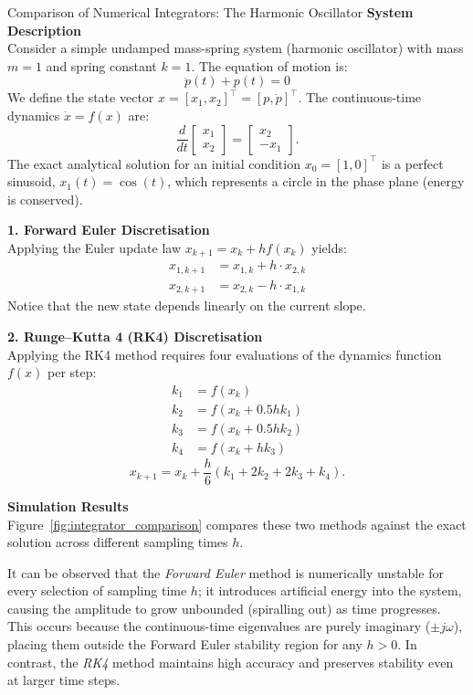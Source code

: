 \begin{examplebox}{Comparison of Numerical Integrators: The Harmonic Oscillator}
	\textbf{System Description} \\
	Consider a simple undamped mass-spring system (harmonic oscillator) with mass $m=1$ and spring constant $k=1$. The equation of motion is:
	\[
	\ddot{p}(t) + p(t) = 0
	\]
	We define the state vector $x = [x_1, x_2]^\top = [p, \dot{p}]^\top$. The continuous-time dynamics $\dot{x} = f(x)$ are:
	\[
	\frac{d}{dt} \begin{bmatrix} x_1 \\ x_2 \end{bmatrix} 
	= 
	\begin{bmatrix} x_2 \\ -x_1 \end{bmatrix}.
	\]
	The exact analytical solution for an initial condition $x_0 = [1, 0]^\top$ is a perfect sinusoid, $x_1(t) = \cos(t)$, which represents a circle in the phase plane (energy is conserved).
	
	\medskip
	\textbf{1. Forward Euler Discretisation} \\
	Applying the Euler update law $x_{k+1} = x_k + h f(x_k)$ yields:
	\begin{align*}
		x_{1, k+1} &= x_{1,k} + h \cdot x_{2,k} \\
		x_{2, k+1} &= x_{2,k} - h \cdot x_{1,k}
	\end{align*}
	Notice that the new state depends linearly on the current slope.
	
	\medskip
	\textbf{2. Runge--Kutta 4 (RK4) Discretisation} \\
	Applying the RK4 method requires four evaluations of the dynamics function $f(x)$ per step:
	\begin{align*}
		k_1 &= f(x_k) \\
		k_2 &= f(x_k + 0.5 h k_1) \\
		k_3 &= f(x_k + 0.5 h k_2) \\
		k_4 &= f(x_k + h k_3)
	\end{align*}
	\[
	x_{k+1} = x_k + \frac{h}{6}(k_1 + 2k_2 + 2k_3 + k_4).
	\]
	
	\medskip
	\textbf{Simulation Results} \\
	Figure~\ref{fig:integrator_comparison} compares these two methods against the exact solution across different sampling times $h$. 
	
	It can be observed that the \emph{Forward Euler} method is numerically unstable for every selection of sampling time $h$; it introduces artificial energy into the system, causing the amplitude to grow unbounded (spiralling out) as time progresses. This occurs because the continuous-time eigenvalues are purely imaginary ($\pm j\omega$), placing them outside the Forward Euler stability region for any $h > 0$. In contrast, the \emph{RK4} method maintains high accuracy and preserves stability even at larger time steps.
\end{examplebox}

